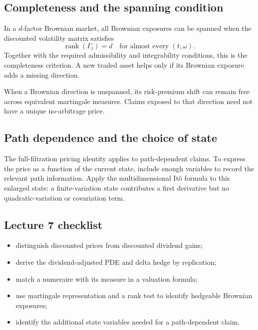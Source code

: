 \subsection{Completeness and the spanning condition}

In a \(d\)-factor Brownian market, all Brownian exposures can be spanned
when the discounted volatility matrix satisfies
\[
\boxed{\operatorname{rank}(\Gamma_t)=d
\quad\text{for almost every }(t,\omega).}
\]
Together with the required admissibility and integrability conditions,
this is the completeness criterion. A new traded asset helps only if
its Brownian exposure adds a missing direction.

When a Brownian direction is unspanned, its risk-premium shift can remain
free across equivalent martingale measures. Claims exposed to that
direction need not have a unique no-arbitrage price.

\subsection{Path dependence and the choice of state}

The full-filtration pricing identity applies to path-dependent claims.
To express the price as a function of the current state, include enough
variables to record the relevant path information. Apply the
multidimensional It\^o formula to this enlarged state: a finite-variation
state contributes a first derivative but no quadratic-variation or
covariation term.

\subsection*{Lecture 7 checklist}
\begin{itemize}[leftmargin=1.5em,itemsep=0.15em]
  \item distinguish discounted prices from discounted dividend gains;
  \item derive the dividend-adjusted PDE and delta hedge by replication;
  \item match a numeraire with its measure in a valuation formula;
  \item use martingale representation and a rank test to identify
        hedgeable Brownian exposures;
  \item identify the additional state variables needed for a path-dependent claim.
\end{itemize}

